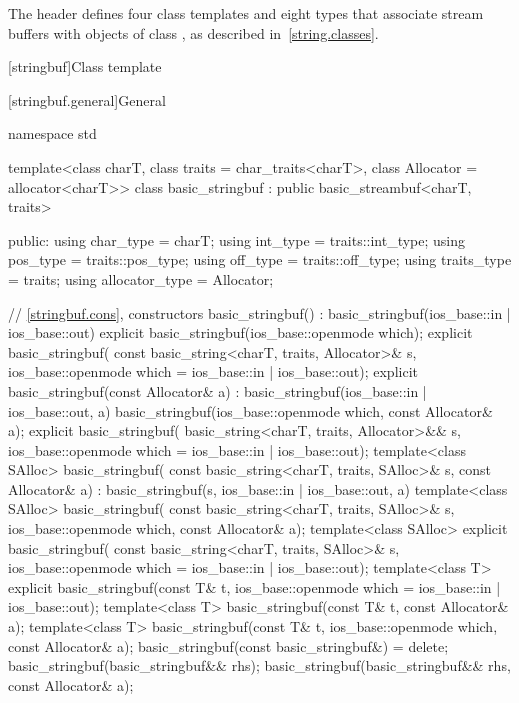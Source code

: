 \pnum
The header  defines four class templates
and eight types that associate stream buffers with objects of class
,
%
as described in~\ref{string.classes}.

[stringbuf]{Class template }

[stringbuf.general]{General}
%
\begin{codeblock}
namespace std {
  template<class charT, class traits = char_traits<charT>, class Allocator = allocator<charT>>
  class basic_stringbuf : public basic_streambuf<charT, traits> {
  public:
    using char_type      = charT;
    using int_type       = traits::int_type;
    using pos_type       = traits::pos_type;
    using off_type       = traits::off_type;
    using traits_type    = traits;
    using allocator_type = Allocator;

    // \ref{stringbuf.cons}, constructors
    basic_stringbuf() : basic_stringbuf(ios_base::in | ios_base::out) {}
    explicit basic_stringbuf(ios_base::openmode which);
    explicit basic_stringbuf(
      const basic_string<charT, traits, Allocator>& s,
      ios_base::openmode which = ios_base::in | ios_base::out);
    explicit basic_stringbuf(const Allocator& a)
      : basic_stringbuf(ios_base::in | ios_base::out, a) {}
    basic_stringbuf(ios_base::openmode which, const Allocator& a);
    explicit basic_stringbuf(
      basic_string<charT, traits, Allocator>&& s,
      ios_base::openmode which = ios_base::in | ios_base::out);
    template<class SAlloc>
      basic_stringbuf(
        const basic_string<charT, traits, SAlloc>& s, const Allocator& a)
        : basic_stringbuf(s, ios_base::in | ios_base::out, a) {}
    template<class SAlloc>
      basic_stringbuf(
        const basic_string<charT, traits, SAlloc>& s,
        ios_base::openmode which, const Allocator& a);
    template<class SAlloc>
      explicit basic_stringbuf(
        const basic_string<charT, traits, SAlloc>& s,
        ios_base::openmode which = ios_base::in | ios_base::out);
    template<class T>
      explicit basic_stringbuf(const T& t,
                               ios_base::openmode which = ios_base::in | ios_base::out);
    template<class T>
      basic_stringbuf(const T& t, const Allocator& a);
    template<class T>
      basic_stringbuf(const T& t, ios_base::openmode which, const Allocator& a);
    basic_stringbuf(const basic_stringbuf&) = delete;
    basic_stringbuf(basic_stringbuf&& rhs);
    basic_stringbuf(basic_stringbuf&& rhs, const Allocator& a);

}}
\end{codeblock}

